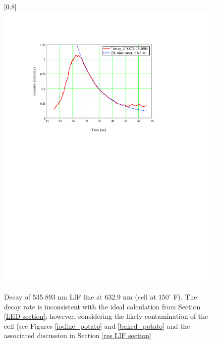 \begin{figure}
\scalebox{0.8}[0.8]{
\includegraphics[bb=0 446 489 685]
{decay/decay.pdf}
}
\caption[Decay of 535.893 nm LIF line at 632.9 nm]{Decay of 535.893 nm LIF line at 632.9 nm (cell at $150^\circ$ F). The decay rate is inconsistent with the ideal calculation from Section \ref{LED section}; however, considering the likely contamination of the cell (see Figures \ref{iodine_potato} and \ref{baked_potato} and the associated discussion in Section \ref{res LIF section}}
\label{decay}
\end{figure}
